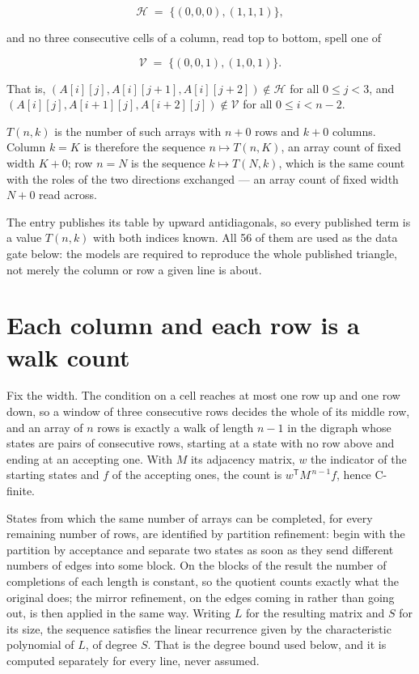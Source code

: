 \documentclass[11pt]{article}
\theoremstyle{definition}
\begin{document}
\[\mathcal{H} \;=\; \{(0,0,0), (1,1,1)\},\]

and no three consecutive cells of a column, read top to bottom, spell one of

\[\mathcal{V} \;=\; \{(0,0,1), (1,0,1)\}.\]

That is, $(A[i][j],A[i][j{+}1],A[i][j{+}2]) \notin \mathcal{H}$ for all $0 \le j < 3$, and $(A[i][j],A[i{+}1][j],A[i{+}2][j]) \notin \mathcal{V}$ for all $0 \le i < n-2$.

$T(n,k)$ is the number of such arrays with $n + 0$ rows and $k + 0$ columns. Column $k = K$ is therefore the sequence $n \mapsto T(n,K)$, an array count of fixed width $K + 0$; row $n = N$ is the sequence $k \mapsto T(N,k)$, which is the same count with the roles of the two directions exchanged --- an array count of fixed width $N + 0$ read across.

The entry publishes its table by upward antidiagonals, so every published term is a value $T(n,k)$ with both indices known. All 56 of them are used as the data gate below: the models are required to reproduce the whole published triangle, not merely the column or row a given line is about.

\section{Each column and each row is a walk count}

Fix the width. The condition on a cell reaches at most one row up and one row down, so a window of three consecutive rows decides the whole of its middle row, and an array of $n$ rows is exactly a walk of length $n-1$ in the digraph whose states are pairs of consecutive rows, starting at a state with no row above and ending at an accepting one. With $M$ its adjacency matrix, $w$ the indicator of the starting states and $f$ of the accepting ones, the count is $w^{\mathsf T}M^{\,n-1}f$, hence C-finite.

States from which the same number of arrays can be completed, for every remaining number of rows, are identified by partition refinement: begin with the partition by acceptance and separate two states as soon as they send different numbers of edges into some block. On the blocks of the result the number of completions of each length is constant, so the quotient counts exactly what the original does; the mirror refinement, on the edges coming in rather than going out, is then applied in the same way. Writing $L$ for the resulting matrix and $S$ for its size, the sequence satisfies the linear recurrence given by the characteristic polynomial of $L$, of degree $S$. That is the degree bound used below, and it is computed separately for every line, never assumed.
\end{document}
